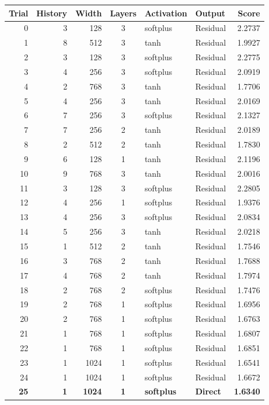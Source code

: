 \begin{tabular}{@{}rrrcllr@{}}
\toprule
Trial & History & Width & Layers & Activation & Output & Score \\
\midrule
0 & 3 & 128 & 3 & softplus & Residual & 2.2737 \\
1 & 8 & 512 & 3 & tanh & Residual & 1.9927 \\
2 & 3 & 128 & 3 & softplus & Residual & 2.2775 \\
3 & 4 & 256 & 3 & softplus & Residual & 2.0919 \\
4 & 2 & 768 & 3 & tanh & Residual & 1.7706 \\
5 & 4 & 256 & 3 & tanh & Residual & 2.0169 \\
6 & 7 & 256 & 3 & softplus & Residual & 2.1327 \\
7 & 7 & 256 & 2 & tanh & Residual & 2.0189 \\
8 & 2 & 512 & 2 & tanh & Residual & 1.7830 \\
9 & 6 & 128 & 1 & tanh & Residual & 2.1196 \\
10 & 9 & 768 & 3 & tanh & Residual & 2.0016 \\
11 & 3 & 128 & 3 & softplus & Residual & 2.2805 \\
12 & 4 & 256 & 1 & softplus & Residual & 1.9376 \\
13 & 4 & 256 & 3 & softplus & Residual & 2.0834 \\
14 & 5 & 256 & 3 & tanh & Residual & 2.0218 \\
15 & 1 & 512 & 2 & tanh & Residual & 1.7546 \\
16 & 3 & 768 & 2 & tanh & Residual & 1.7688 \\
17 & 4 & 768 & 2 & tanh & Residual & 1.7974 \\
18 & 2 & 768 & 2 & softplus & Residual & 1.7476 \\
19 & 2 & 768 & 1 & softplus & Residual & 1.6956 \\
20 & 2 & 768 & 1 & softplus & Residual & 1.6763 \\
21 & 1 & 768 & 1 & softplus & Residual & 1.6807 \\
22 & 1 & 768 & 1 & softplus & Residual & 1.6851 \\
23 & 1 & 1024 & 1 & softplus & Residual & 1.6541 \\
24 & 1 & 1024 & 1 & softplus & Residual & 1.6672 \\
\textbf{25} & \textbf{1} & \textbf{1024} & \textbf{1} & \textbf{softplus} & \textbf{Direct} & \textbf{1.6340} \\
\bottomrule
\end{tabular}

